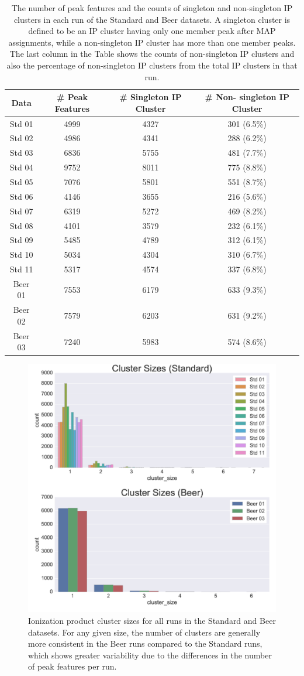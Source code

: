 \begin{table}[!htbp]
\centering
\caption[The number of peak features and the counts of singleton and non-singleton IP clusters in each run of the Standard and Beer datasets.]{The number of peak features and the counts of singleton and non-singleton IP clusters in each run of the Standard and Beer datasets. A singleton cluster is defined to be an IP cluster having only one member peak after MAP assignments, while a non-singleton IP cluster has more than one member peaks. The last column in the Table shows the counts of non-singleton IP clusters and also the percentage of non-singleton IP clusters from the total IP clusters in that run. \label{Tab:cluster-counts}}
\begin{tabular}{|c|c|c|c|} 
\hline 
Data & \# Peak Features & \# Singleton IP Cluster & \# Non- singleton IP Cluster\tabularnewline
\hline 
\hline 
Std 01 & 4999 & 4327 & 301 (6.5\%)\tabularnewline
\hline 
Std 02 & 4986 & 4341 & 288 (6.2\%)\tabularnewline
\hline 
Std 03 & 6836 & 5755 & 481 (7.7\%)\tabularnewline
\hline 
Std 04 & 9752 & 8011 & 775 (8.8\%)\tabularnewline
\hline 
Std 05 & 7076 & 5801 & 551 (8.7\%)\tabularnewline
\hline 
Std 06 & 4146 & 3655 & 216 (5.6\%)\tabularnewline
\hline 
Std 07 & 6319 & 5272 & 469 (8.2\%)\tabularnewline
\hline 
Std 08 & 4101 & 3579 & 232 (6.1\%)\tabularnewline
\hline 
Std 09 & 5485 & 4789 & 312 (6.1\%)\tabularnewline
\hline 
Std 10 & 5034 & 4304 & 310 (6.7\%)\tabularnewline
\hline 
Std 11 & 5317 & 4574 & 337 (6.8\%)\tabularnewline
\hline 
Beer 01  & 7553 & 6179 & 633 (9.3\%)\tabularnewline
\hline 
Beer 02 & 7579 & 6203 & 631 (9.2\%)\tabularnewline
\hline 
Beer 03 & 7240 & 5983 & 574 (8.6\%)\tabularnewline
\hline 
\end{tabular}
\end{table}

\begin{figure}[!htbp]
\centering
\includegraphics[width=0.5\linewidth]{05-precursor-cluster/figures/counts_cluster.pdf}
\caption[Ionization product cluster sizes for all runs in the Standard and Beer datasets.]{\label{fig:cluster-counts} Ionization product cluster sizes for all runs in the Standard and Beer datasets. For any given size, the number of clusters are generally more consistent in the Beer runs compared to the Standard runs, which shows greater variability due to the differences in the number of peak features per run.}
\end{figure}

